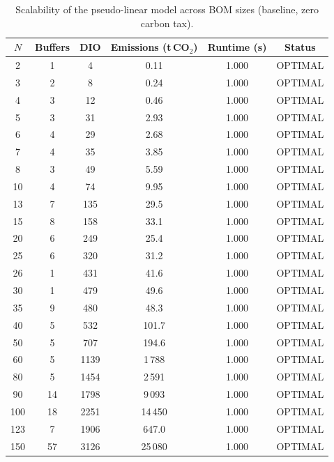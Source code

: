 \begin{table}[!htbp]\centering
\caption{Scalability of the pseudo-linear model across BOM sizes (baseline, zero carbon tax).}\label{tab:scal}
\begin{tabular}{cccccc}
\toprule
$N$ & Buffers & DIO & Emissions (t\,CO$_2$) & Runtime (s) & Status\\
\midrule
2 & 1 & 4 & 0.11 & 1.000 & OPTIMAL \\
3 & 2 & 8 & 0.24 & 1.000 & OPTIMAL \\
4 & 3 & 12 & 0.46 & 1.000 & OPTIMAL \\
5 & 3 & 31 & 2.93 & 1.000 & OPTIMAL \\
6 & 4 & 29 & 2.68 & 1.000 & OPTIMAL \\
7 & 4 & 35 & 3.85 & 1.000 & OPTIMAL \\
8 & 3 & 49 & 5.59 & 1.000 & OPTIMAL \\
10 & 4 & 74 & 9.95 & 1.000 & OPTIMAL \\
13 & 7 & 135 & 29.5 & 1.000 & OPTIMAL \\
15 & 8 & 158 & 33.1 & 1.000 & OPTIMAL \\
20 & 6 & 249 & 25.4 & 1.000 & OPTIMAL \\
25 & 6 & 320 & 31.2 & 1.000 & OPTIMAL \\
26 & 1 & 431 & 41.6 & 1.000 & OPTIMAL \\
30 & 1 & 479 & 49.6 & 1.000 & OPTIMAL \\
35 & 9 & 480 & 48.3 & 1.000 & OPTIMAL \\
40 & 5 & 532 & 101.7 & 1.000 & OPTIMAL \\
50 & 5 & 707 & 194.6 & 1.000 & OPTIMAL \\
60 & 5 & 1139 & 1\,788 & 1.000 & OPTIMAL \\
80 & 5 & 1454 & 2\,591 & 1.000 & OPTIMAL \\
90 & 14 & 1798 & 9\,093 & 1.000 & OPTIMAL \\
100 & 18 & 2251 & 14\,450 & 1.000 & OPTIMAL \\
123 & 7 & 1906 & 647.0 & 1.000 & OPTIMAL \\
150 & 57 & 3126 & 25\,080 & 1.000 & OPTIMAL \\
\bottomrule
\end{tabular}
\end{table}
